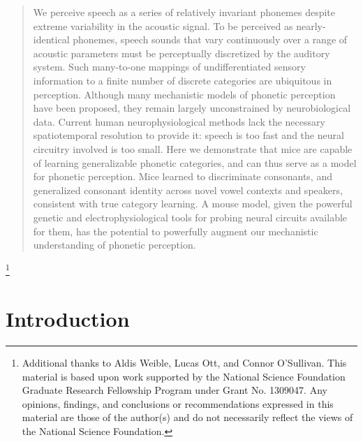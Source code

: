 





\begin{abstract}
We perceive speech as a series of relatively invariant phonemes despite extreme variability in the acoustic signal. To be perceived as nearly-identical phonemes, speech sounds that vary continuously over a range of acoustic parameters must be perceptually discretized by the auditory system. Such many-to-one mappings of undifferentiated sensory information to a finite number of discrete categories are ubiquitous in perception. Although many mechanistic models of phonetic perception have been proposed, they remain largely unconstrained by neurobiological data. Current human neurophysiological methods lack the necessary spatiotemporal resolution to provide it: speech is too fast and the neural circuitry involved is too small. Here we demonstrate that mice are capable of learning generalizable phonetic categories, and can thus serve as a model for phonetic perception. Mice learned to discriminate consonants, and generalized consonant identity across novel vowel contexts and speakers, consistent with true category learning. A mouse model, given the powerful genetic and electrophysiological tools for probing neural circuits available for them, has the potential to powerfully augment our mechanistic understanding of phonetic perception.

\end{abstract}

\maketitle

\thanks{Additional thanks to Aldis Weible, Lucas Ott, and Connor O'Sullivan. This material is based upon work supported by the National Science Foundation Graduate Research Fellowship Program under Grant No. 1309047. Any opinions, findings, and conclusions or recommendations expressed in this material are those of the author(s) and do not necessarily reflect the views of the National Science Foundation.}

%
%
%
\section{Introduction}
